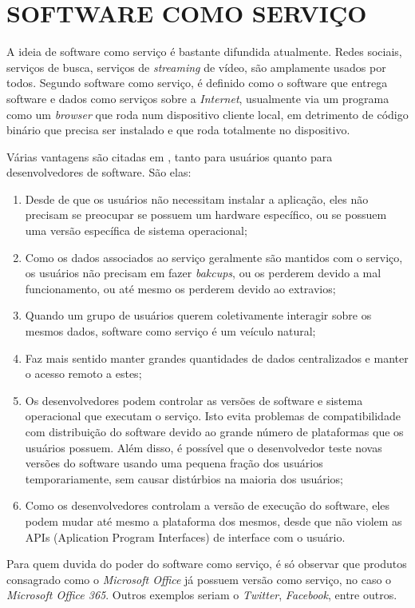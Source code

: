 \section{SOFTWARE COMO SERVIÇO} 

A ideia de software como serviço é bastante difundida atualmente. 
Redes sociais, serviços de busca, serviços de \emph{streaming} de vídeo, são amplamente usados por todos. 
Segundo \cite{Fox2012} software como serviço, é definido como o software que entrega software e dados como serviços sobre a \emph{Internet}, usualmente via um programa como um \emph{browser} que roda num dispositivo cliente local, em detrimento de código binário que precisa ser instalado e que roda totalmente no dispositivo.

Várias vantagens são citadas em \cite{Fox2012}, tanto para usuários quanto para desenvolvedores de software. São elas:

\begin{enumerate}
	\item Desde de que os usuários não necessitam instalar a aplicação, eles não precisam se preocupar se possuem um hardware específico, ou se possuem uma versão específica de sistema operacional;
	\item Como os dados associados ao serviço geralmente são mantidos com o serviço, os usuários não precisam em fazer \emph{bakcups}, ou os perderem devido a mal funcionamento, ou até mesmo os perderem devido ao extravios;
	\item Quando um grupo de usuários querem coletivamente interagir sobre os mesmos dados, software como serviço é um veículo natural;
	\item Faz mais sentido manter grandes quantidades de dados centralizados e manter o acesso remoto a estes;
	\item Os desenvolvedores podem controlar as versões de software e sistema operacional que executam o serviço. Isto evita problemas de compatibilidade com distribuição do software devido ao grande número de plataformas que os usuários possuem. Além disso, é possível que o desenvolvedor teste novas versões do software usando uma pequena fração dos usuários temporariamente, sem causar distúrbios na maioria dos usuários;
	\item Como os desenvolvedores controlam a versão de execução do software, eles podem mudar até mesmo a plataforma dos mesmos, desde que não violem as APIs (Aplication Program Interfaces) de interface com o usuário.
\end{enumerate}

	Para quem duvida do poder do software como serviço, é só observar que produtos consagrado como o \emph{Microsoft Office} já possuem versão como serviço, no caso o \emph{Microsoft Office 365}. Outros exemplos seriam o \emph{Twitter}, \emph{Facebook}, entre outros.

